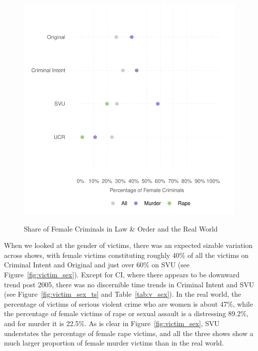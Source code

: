 \documentclass[12pt, letterpaper]{article}
\begin{document}
\begin{figure}[htbp]
\centering
\caption{Share of Female Criminals in Law \& Order and the Real World}
\includegraphics[scale=.9]{../figs/all_criminals_by_gender.pdf}
\label{fig:perp_sex}
\end{figure}

When we looked at the gender of victims, there was an expected sizable variation across shows, with female victims constituting roughly 40\% of all the victims on Criminal Intent and Original and just over 60\% on SVU (see Figure~\ref{fig:victim_sex}). Except for CI, where there appears to be downward trend post 2005, there was no discernible time trends in Criminal Intent and SVU (see Figure~\ref{fig:victim_sex_ts} and Table~\ref{tab:v_sex}). In the real world, the percentage of victims of serious violent crime who are women is about 47\%, while the percentage of female victims of rape or sexual assault is a distressing 89.2\%, and for murder it is 22.5\%. As is clear in Figure~\ref{fig:victim_sex}, SVU understates the percentage of female rape victims, and all the three shows show a much larger proportion of female murder victims than in the real world.   
\end{document}
